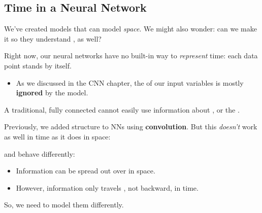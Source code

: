     \phantom{}
        
    \subsection{Time in a Neural Network}
    
        We've created models that can model \textit{space}. We might also wonder: can we make it so they understand , as well?

        Right now, our neural networks have no built-in way to \textit{represent} time: each data point stands by itself.

        \begin{itemize}
            \item As we discussed in the CNN chapter, the  of our input variables is mostly \textbf{ignored} by the model.\\
        \end{itemize}

        \begin{concept}
            A traditional, fully connected  cannot easily use information about , or the .
        \end{concept}

        Previously, we added structure to NNs using \textbf{convolution}. But this \textit{doesn't} work as well in time as it does in space:\\

        \begin{concept}
             and  behave differently:
            
            \begin{itemize}
                \item Information can be spread out over  in space.
                \item However, information only travels , not backward, in time.
            \end{itemize}

            So, we need to model them differently.
        \end{concept}
        
